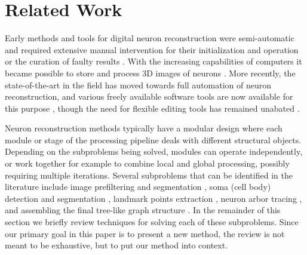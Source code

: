 \section{Related Work}
\label{sec:related-work}
Early methods and tools for digital neuron reconstruction were semi-automatic and required extensive manual intervention for their initialization and operation or the curation of faulty results \citep{glaser1965semi, capowski1981, glaser1990, masseroli1993}. With the increasing capabilities of computers it became possible to store and process 3D images of neurons \citep{cohen1994, belichenko1995}. More recently, the state-of-the-art in the field has moved towards full automation of neuron reconstruction, and various freely available software tools are now available for this purpose \citep{peng2010v3d, longair2011simple, peng2014extensible, peng2014virtual}, though the need for flexible editing tools has remained unabated \citep{luisi2011farsight, dercksen2014filament}.

Neuron reconstruction methods typically have a modular design where each module or stage of the processing pipeline deals with different structural objects. Depending on the subproblems being solved, modules can operate independently, or work together for example to combine local and global processing, possibly requiring multiple iterations. Several subproblems that can be identified in the literature include image prefiltering and segmentation \citep{zhou2015adaptive, turetken2011automated, sironi2016multiscale, mukherjee2013vector}, soma (cell body) detection and segmentation \citep{quan2013neurogps}, landmark points extraction \citep{al2008improved, wang2011broadly, choromanska2012automatic, su2012junction, radojevic2016fuzzy}, neuron arbor tracing \citep{zhao2011automated, liu2016rivulet, leandro2009automatic, radojevic2017automated, xiao2013app2}, and assembling the final tree-like graph structure \citep{zhou2016tremap, turetken2011automated, yuan2009mdl}. In the remainder of this section we briefly review techniques for solving each of these subproblems. Since our primary goal in this paper is to present a new method, the review is not meant to be exhaustive, but to put our method into context.

